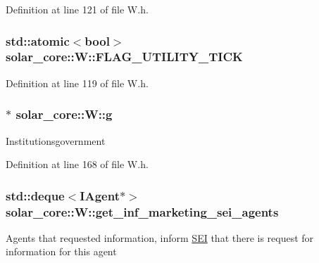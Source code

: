 Definition at line 121 of file W.\+h.

\hypertarget{classsolar__core_1_1_w_adeb9d0fefdb9b63c8e28d93fcff34468}{}
\subsubsection[{F\+L\+A\+G\+\_\+\+U\+T\+I\+L\+I\+T\+Y\+\_\+\+T\+I\+C\+K}]{\setlength{\rightskip}{0pt plus 5cm}std\+::atomic$<$bool$>$ solar\+\_\+core\+::\+W\+::\+F\+L\+A\+G\+\_\+\+U\+T\+I\+L\+I\+T\+Y\+\_\+\+T\+I\+C\+K}\label{classsolar__core_1_1_w_adeb9d0fefdb9b63c8e28d93fcff34468}


Definition at line 119 of file W.\+h.

\hypertarget{classsolar__core_1_1_w_a9e50ef0da579cdfc3da22c16a492bc44}{}
\subsubsection[{g}]{$\ast$ solar\+\_\+core\+::\+W\+::g}\label{classsolar__core_1_1_w_a9e50ef0da579cdfc3da22c16a492bc44}
Institutionsgovernment 

Definition at line 168 of file W.\+h.

\hypertarget{classsolar__core_1_1_w_a81b5469757f203c9619ff69323ac0f77}{}
\subsubsection[{get\+\_\+inf\+\_\+marketing\+\_\+sei\+\_\+agents}]{\setlength{\rightskip}{0pt plus 5cm}std\+::deque$<${\bf I\+Agent}$\ast$$>$ solar\+\_\+core\+::\+W\+::get\+\_\+inf\+\_\+marketing\+\_\+sei\+\_\+agents\hspace{0.3cm}{\ttfamily [protected]}}\label{classsolar__core_1_1_w_a81b5469757f203c9619ff69323ac0f77}
Agents that requested information, inform \hyperlink{classsolar__core_1_1_s_e_i}{S\+E\+I} that there is request for information for this agent 

